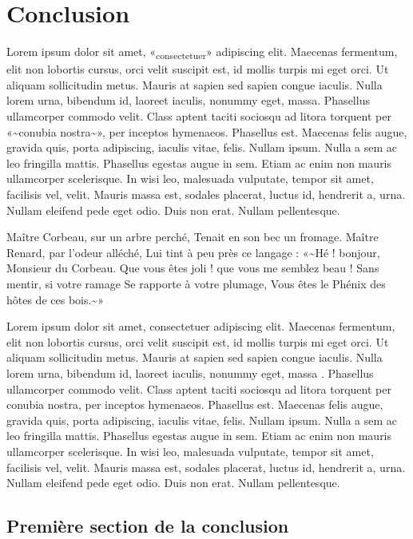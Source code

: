 \hypertarget{conclusion}{%
\chapter*{Conclusion}\label{conclusion}}

Lorem ipsum dolor sit amet, «\textsubscript{consectetuer}» adipiscing
elit. Maecenas fermentum, elit non lobortis cursus, orci velit suscipit
est, id mollis turpis mi eget orci. Ut aliquam sollicitudin metus.
Mauris at sapien sed sapien congue iaculis. Nulla lorem urna, bibendum
id, laoreet iaculis, nonummy eget, massa. Phasellus ullamcorper commodo
velit. Class aptent taciti sociosqu ad litora torquent per
«\textasciitilde conubia nostra\textasciitilde», per inceptos hymenaeos.
Phasellus est. Maecenas felis augue, gravida quis, porta adipiscing,
iaculis vitae, felis. Nullam ipsum. Nulla a sem ac leo fringilla mattis.
Phasellus egestas augue in sem. Etiam ac enim non mauris ullamcorper
scelerisque. In wisi leo, malesuada vulputate, tempor sit amet,
facilisis vel, velit. Mauris massa est, sodales placerat, luctus id,
hendrerit a, urna. Nullam eleifend pede eget odio. Duis non erat. Nullam
pellentesque.

Maître Corbeau, sur un arbre perché, Tenait en son bec un fromage.
Maître Renard, par l'odeur alléché, Lui tint à peu près ce langage :
«\textasciitilde Hé ! bonjour, Monsieur du Corbeau. Que vous êtes joli !
que vous me semblez beau ! Sans mentir, si votre ramage Se rapporte à
votre plumage, Vous êtes le Phénix des hôtes de ces
bois.\textasciitilde»

Lorem ipsum dolor sit amet, consectetuer adipiscing elit. Maecenas
fermentum, elit non lobortis cursus, orci velit suscipit est, id mollis
turpis mi eget orci. Ut aliquam sollicitudin metus. Mauris at sapien sed
sapien congue iaculis. Nulla lorem urna, bibendum id, laoreet iaculis,
nonummy eget, massa \autocite{Pierre1901}. Phasellus ullamcorper commodo
velit. Class aptent taciti sociosqu ad litora torquent per conubia
nostra, per inceptos hymenaeos. Phasellus est. Maecenas felis augue,
gravida quis, porta adipiscing, iaculis vitae, felis. Nullam ipsum.
Nulla a sem ac leo fringilla mattis. Phasellus egestas augue in sem.
Etiam ac enim non mauris ullamcorper scelerisque. In wisi leo, malesuada
vulputate, tempor sit amet, facilisis vel, velit. Mauris massa est,
sodales placerat, luctus id, hendrerit a, urna. Nullam eleifend pede
eget odio. Duis non erat. Nullam pellentesque.

\hypertarget{premiuxe8re-section-de-la-conclusion}{%
\section*{Première section de la
conclusion}\label{premiuxe8re-section-de-la-conclusion}}


